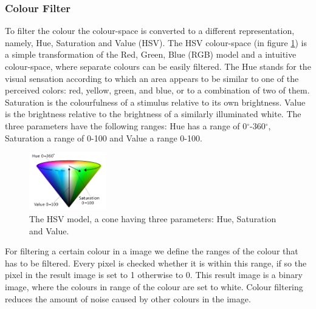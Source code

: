 \documentclass[a4paper]{article}
\begin{document}
\subsubsection{Colour Filter}
To filter the colour the colour-space is converted to a different representation, namely, Hue, Saturation and Value (HSV). The HSV colour-space (in figure \ref{hsv})  is a simple transformation of the Red, Green, Blue (RGB) model and a intuitive colour-space, where separate colours can be easily filtered. The Hue stands for the visual sensation according to which an area appears to be similar to one of the perceived colors: red, yellow, green, and blue, or to a combination of two of them. Saturation is the colourfulness of a stimulus relative to its own brightness. Value is the brightness relative to the brightness of a similarly illuminated white. The three parameters have the following ranges: Hue has a range of 0$^{\circ}$-360$^{\circ}$, Saturation a range of 0-100 and Value a range 0-100.

\begin{figure}[!ht]
\centering
\includegraphics[width=0.3\textwidth]{images/hsv.png}
\caption{The HSV model, a cone having three parameters: Hue, Saturation and Value.}
\label{hsv}
\end{figure}

For filtering a certain colour in a image we define the ranges of the colour that has to be filtered. Every pixel is checked whether it is within this range, if so the pixel in the result image is set to 1 otherwise to 0. This result image is a binary image, where the colours in range of the colour are set to white. Colour filtering reduces the amount of noise caused by other colours in the image.

\end{document}
